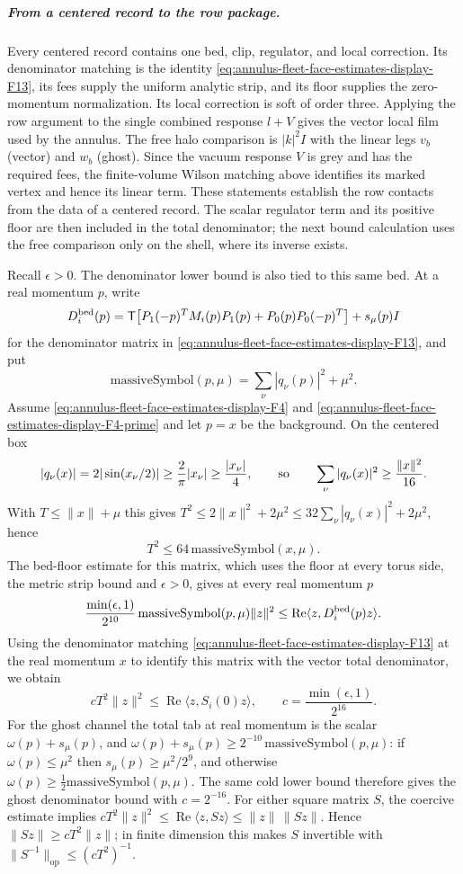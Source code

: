 \subparagraph{From a centered record to the row package.}
Every centered record contains one bed, clip, regulator, and local
correction. Its denominator matching is the identity
\eqref{eq:annulus-fleet-face-estimates-display-F13}, its fees supply the uniform analytic strip, and its
floor supplies the zero-momentum normalization. Its local correction
is soft of order three. Applying the row argument to the single
combined response $l+V$ gives the vector local film used by the
annulus. The free halo comparison is $|k|^2I$ with the linear legs
$v_b$ (vector) and $w_b$ (ghost). Since the vacuum response
$V$ is grey and has the required fees, the finite-volume Wilson matching
above identifies its marked vertex and hence its linear term. These
statements establish the row contacts from the data of a centered
record. The
scalar regulator term and its positive floor are then included in the
total denominator; the next bound calculation uses the free comparison
only on the shell, where its inverse exists.

Recall $\epsilon>0$. The denominator
lower bound is also tied to this same bed. At a real momentum $p$, write
\[
 D_i^{\rm bed}(p)=
 \mathsf T\!\left[P_1(-p)^TM_i(p)P_1(p)
       +P_0(p)P_0(-p)^T\right]+s_\mu(p)I
\]
for the denominator matrix in \eqref{eq:annulus-fleet-face-estimates-display-F13}, and put
\[
 \mathrm{massiveSymbol}(p,\mu)=\sum_\nu|q_\nu(p)|^2+\mu^2 .
\]
Assume \eqref{eq:annulus-fleet-face-estimates-display-F4} and \eqref{eq:annulus-fleet-face-estimates-display-F4-prime} and let $p=x$ be the background. On the
centered box
\[
 |q_\nu(x)|=2|\sin(x_\nu/2)|\geq\frac2\pi|x_\nu|\geq\frac{|x_\nu|}4,
 \qquad\hbox{so}\qquad \sum_\nu|q_\nu(x)|^2\geq\frac{\|x\|^2}{16}.
\]
With $T\leq\|x\|+\mu$ this gives
$T^2\leq2\|x\|^2+2\mu^2\leq32\sum_\nu|q_\nu(x)|^2+2\mu^2$, hence
\[
 T^2\leq64\,\mathrm{massiveSymbol}(x,\mu).
\]
The bed-floor estimate for this matrix, which uses the floor at every
torus side, the metric strip bound and $\epsilon>0$, gives at every
real momentum $p$
\[
 \frac{\min(\epsilon,1)}{2^{10}}\,\mathrm{massiveSymbol}(p,\mu)\|z\|^2
       \leq \operatorname{Re}\langle z,D_i^{\rm bed}(p)z\rangle.
\]
Using the denominator matching \eqref{eq:annulus-fleet-face-estimates-display-F13} at the real momentum $x$ to
identify this matrix with the vector total denominator, we obtain
\[
 cT^2\|z\|^2\leq
   \operatorname{Re}\langle z,S_i(0)z\rangle,
 \qquad c=\frac{\min(\epsilon,1)}{2^{16}}.
\]
For the ghost channel the total tab at real momentum is the scalar
$\omega(p)+s_\mu(p)$, and
$\omega(p)+s_\mu(p)\geq2^{-10}\,\mathrm{massiveSymbol}(p,\mu)$: if
$\omega(p)\leq\mu^2$ then $s_\mu(p)\geq\mu^2/2^{9}$, and otherwise
$\omega(p)\geq\frac12\mathrm{massiveSymbol}(p,\mu)$. The same cold lower bound
therefore gives the ghost
denominator bound with $c=2^{-16}$. For either square matrix $S$, the
coercive estimate implies
$cT^2\|z\|^2\leq\operatorname{Re}\langle z,Sz\rangle
\leq\|z\|\,\|Sz\|$. Hence $\|Sz\|\geq cT^2\|z\|$; in finite
dimension this makes $S$ invertible with
$\|S^{-1}\|_{\mathrm{op}}\leq(cT^2)^{-1}$.

